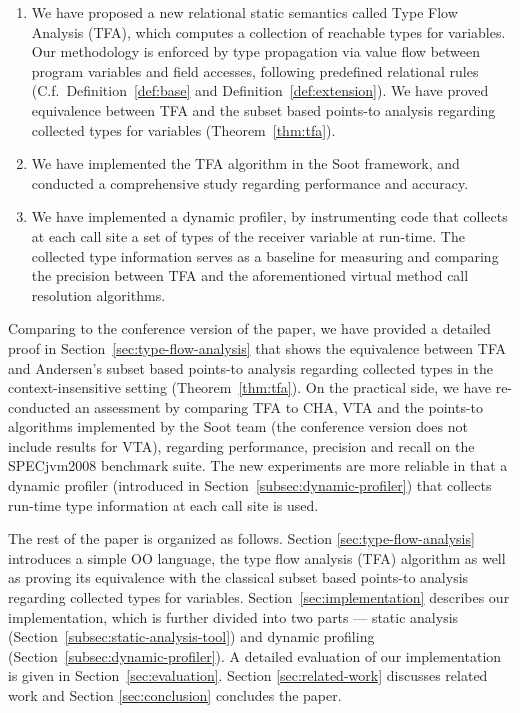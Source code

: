 \documentclass{fac}
\begin{document}
\begin{enumerate}
  \item We have proposed a new relational static semantics called Type Flow Analysis (TFA), which computes a collection of reachable types for variables. Our methodology is enforced by type propagation via value flow between program variables and field accesses, following predefined relational rules (C.f.~Definition~\ref{def:base} and Definition~\ref{def:extension}). We have proved equivalence between TFA and the subset based points-to analysis regarding collected types for variables (Theorem~\ref{thm:tfa}). %
  \item We have implemented the TFA algorithm in the Soot framework, and conducted a comprehensive study regarding performance and accuracy. %
  \item %
  We have implemented a dynamic profiler, by instrumenting code that collects at each call site a set of types of the receiver variable at run-time. The collected type information serves as a baseline for measuring and comparing the precision between TFA and the aforementioned virtual method call resolution algorithms.
\end{enumerate}

Comparing to the conference version of the paper, we have provided a detailed proof in Section~\ref{sec:type-flow-analysis} that shows the equivalence between TFA and Andersen's subset based points-to analysis regarding collected types in the context-insensitive setting (Theorem~\ref{thm:tfa}). On the practical side, we have re-conducted an assessment by comparing TFA to CHA, VTA and the points-to algorithms implemented by the Soot team (the conference version does not include results for VTA), regarding performance, precision and recall on the SPECjvm2008 benchmark suite. The new experiments are more reliable in that a dynamic profiler (introduced in Section~\ref{subsec:dynamic-profiler}) that collects run-time type information at each call site is used. %

The rest of the paper is organized as follows. Section \ref{sec:type-flow-analysis} introduces a simple OO language, the type flow analysis (TFA) algorithm as well as proving its equivalence with the classical subset based points-to analysis regarding collected types for variables. Section~\ref{sec:implementation} describes our implementation, which is further divided into two parts --- static analysis (Section~\ref{subsec:static-analysis-tool}) and dynamic profiling (Section~\ref{subsec:dynamic-profiler}). A detailed evaluation of our implementation is given in Section~\ref{sec:evaluation}.
Section \ref{sec:related-work} discusses related work and Section \ref{sec:conclusion} concludes the paper.
%
\end{document}
